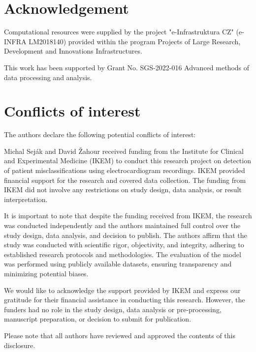 \documentclass[preprint,12pt]{elsarticle}
\begin{document}
\section*{Acknowledgement}
\noindent Computational resources were supplied by the project "e-Infrastruktura CZ" (e-INFRA LM2018140) provided within the program Projects of Large Research, Development and Innovations Infrastructures.

\vspace{0.9em}

\noindent This work has been supported by Grant No. SGS-2022-016 Advanced methods of data processing and analysis.

\section*{Conflicts of interest}

\noindent The authors declare the following potential conflicts of interest:

Michal Seják and David Žahour received funding from the Institute for Clinical and Experimental Medicine (IKEM) to conduct this research project on detection of patient misclassifications using electrocardiogram recordings.
IKEM provided financial support for the research and covered data collection. The funding from IKEM did not involve any restrictions on study design, data analysis, or result interpretation.

It is important to note that despite the funding received from IKEM, the research was conducted independently and the authors maintained full control over the study design, data analysis, and decision to publish. The authors affirm that the study was conducted with scientific rigor, objectivity, and integrity, adhering to established research protocols and methodologies. The evaluation of the model was performed using publicly available datasets, ensuring transparency and minimizing potential biases.

We would like to acknowledge the support provided by IKEM and express our gratitude for their financial assistance in conducting this research. However, the funders had no role in the study design, data analysis or pre-processing, manuscript preparation, or decision to submit for publication.

Please note that all authors have reviewed and approved the contents of this disclosure.

 

 
\end{document}
